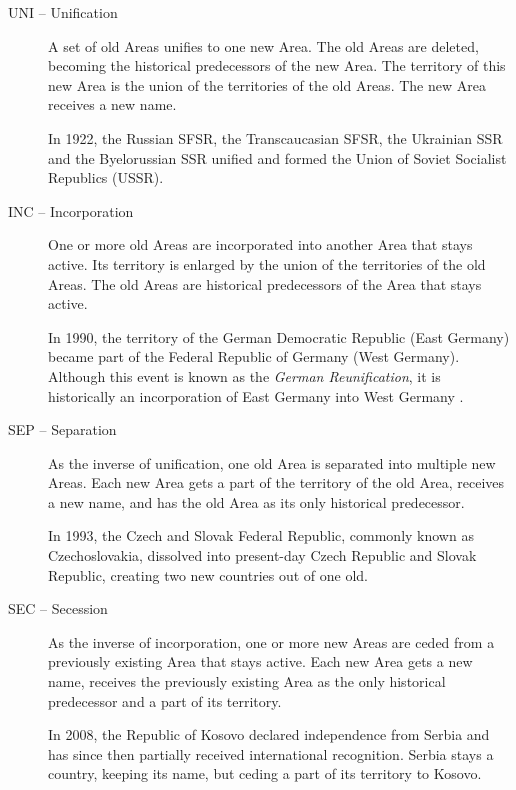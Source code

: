 \newpage
\begin{description}

  \item[UNI -- Unification]
  A set of old Areas unifies to one new Area. The old Areas are deleted, becoming the historical predecessors of the new Area. The territory of this new Area is the union of the territories of the old Areas. The new Area receives a new name. \\[0.25em]
  \begin{footnotesize}
    In 1922, the Russian SFSR, the Transcaucasian SFSR, the Ukrainian SSR and the Byelorussian SSR unified and formed the Union of Soviet Socialist Republics (USSR).
  \end{footnotesize}

  \item[INC -- Incorporation]
  One or more old Areas are incorporated into another Area that stays active. Its territory is enlarged by the union of the territories of the old Areas. The old Areas are historical predecessors of the Area that stays active. \\[0.25em]
  \begin{footnotesize}
    In 1990, the territory of the German Democratic Republic (East Germany) became part of the Federal Republic of Germany (West Germany). Although this event is known as the \emph{German Reunification}, it is historically an incorporation of East Germany into West Germany \cite{incorporationEastWestGermany}.
  \end{footnotesize}

  \item[SEP -- Separation]
  As the inverse of unification, one old Area is separated into multiple new Areas. Each new Area gets a part of the territory of the old Area, receives a new name, and has the old Area as its only historical predecessor. \\[0.25em]
  \begin{footnotesize}
    In 1993, the Czech and Slovak Federal Republic, commonly known as Czechoslovakia, dissolved into present-day Czech Republic and Slovak Republic, creating two new countries out of one old.
  \end{footnotesize}

  \item[SEC -- Secession]
  As the inverse of incorporation, one or more new Areas are ceded from a previously existing Area that stays active. Each new Area gets a new name, receives the previously existing Area as the only historical predecessor and a part of its territory. \\[0.25em]
  \begin{footnotesize}
    In 2008, the Republic of Kosovo declared independence from Serbia and has since then partially received international recognition. Serbia stays a country, keeping its name, but ceding a part of its territory to Kosovo.
  \end{footnotesize}


\end{description}
